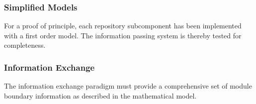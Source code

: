 \subsubsection{Simplified Models}
For a proof of principle, each repository subcomponent has been 
implemented with a first order model. The information passing system 
is thereby tested for completeness. 

\subsubsection{Information Exchange}
The information exchange paradigm must provide a comprehensive set of 
module boundary information as described in the mathematical model.
